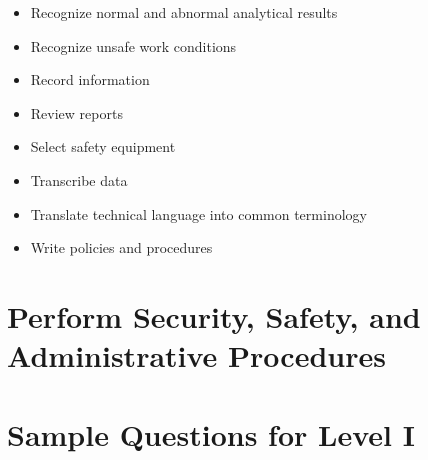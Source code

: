 \documentclass[10pt]{article}
\begin{document}
\begin{itemize}
  \item Recognize normal and abnormal analytical results

  \item Recognize unsafe work conditions

  \item Record information

  \item Review reports

  \item Select safety equipment

  \item Transcribe data

  \item Translate technical language into common terminology

  \item Write policies and procedures

\end{itemize}

\section{Perform Security, Safety, and Administrative Procedures}
\section{Sample Questions for Level I}
\end{document}
